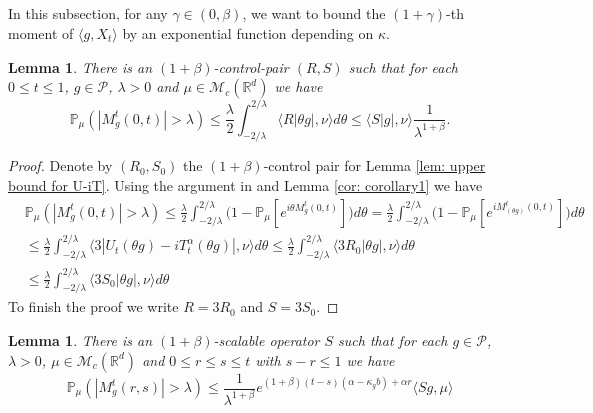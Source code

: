 \documentclass[12pt,oneside,english]{amsart}
\theoremstyle{plain}
\newtheorem{lem}[thm]{Lemma}
\theoremstyle{definition}
\numberwithin{equation}{section}
\newcommand{\added}[1]{{\color{blue}#1}}\newcommand{\deleted}[1]{{\color{red}#1}}
\begin{document}
\subsection{}

 In this subsection, for any $\gamma \in (0,\beta)$, we want to bound the $(1+\gamma)$-th moment of $\langle g ,X_t \rangle$ \deleted{by an exponential function depending on $\kappa$}.

\added{
\begin{lem}
\label{lem: control pair for P(M>lambda)}
    There is an $(1+\beta)$-control-pair $(R,S)$ such that for each $0\leq t\leq 1$, $g\in \mathcal P$, $\lambda >0$ and $\mu\in \mathcal M_c(\mathbb R^d)$ we have
\[
    \mathbb P_\mu (|M^t_g(0,t)| > \lambda) 
    \leq \frac{\lambda}{2}\int_{-2/\lambda}^{2/\lambda}\langle R|\theta g|,\nu\rangle d\theta    
    \leq \langle S| g|,\nu\rangle \frac{1}{\lambda^{1+\beta}}.
\]
\end{lem}
}
\added{
\begin{proof}
    Denote by $(R_0,S_0)$ the $(1+\beta)$-control pair for Lemma \ref{lem: upper bound for U-iT}.
    Using the argument in \cite[Proof of Theorem 3.3.6]{Durrett2010Probability} and Lemma \ref{cor: corollary1} we have
\begin{align}
    &\mathbb P_\mu (|M^t_g(0,t)| > \lambda) 
    \leq \frac{\lambda}{2}\int_{-2/\lambda}^{2/\lambda}\Big(1 - \mathbb P_\mu[e^{i\theta M_g^t(0,t)}]\Big)d\theta
    = \frac{\lambda}{2}\int_{-2/\lambda}^{2/\lambda}\Big(1 - \mathbb P_\mu[e^{iM_{(\theta g)}^t(0,t)}]\Big)d\theta
    \\&\leq \frac{\lambda}{2}\int_{-2/\lambda}^{2/\lambda}\langle 3|U_t(\theta g) - iT_t^\alpha(\theta g)|,\nu\rangle d\theta
    \leq \frac{\lambda}{2}\int_{-2/\lambda}^{2/\lambda}\langle 3R_0|\theta g|,\nu\rangle d\theta
    \\& \leq \frac{\lambda}{2}\int_{-2/\lambda}^{2/\lambda}\langle 3S_0|\theta g|,\nu\rangle d\theta
\end{align}
    To finish the proof we write $R=3R_0$ and $S= 3S_0$.
\end{proof}
}
\added{
\begin{lem}
    There is an $(1+\beta)$-scalable operator $S$ such that for each $g\in \mathcal P$, $\lambda >0$, $\mu\in \mathcal M_c(\mathbb R^d)$ and $0\leq r\leq s\leq t$ with $s-r \leq 1$ we have
\[
    \mathbb P_{\mu}(|M^t_g(r,s)|>\lambda) 
    \leq \frac{ 1}{\lambda^{1+\beta}} e^{(1+\beta)(t-s)(\alpha- \kappa_gb)+ \alpha r} \langle Sg,\mu\rangle  
\]
\end{lem}
}
\end{document}
